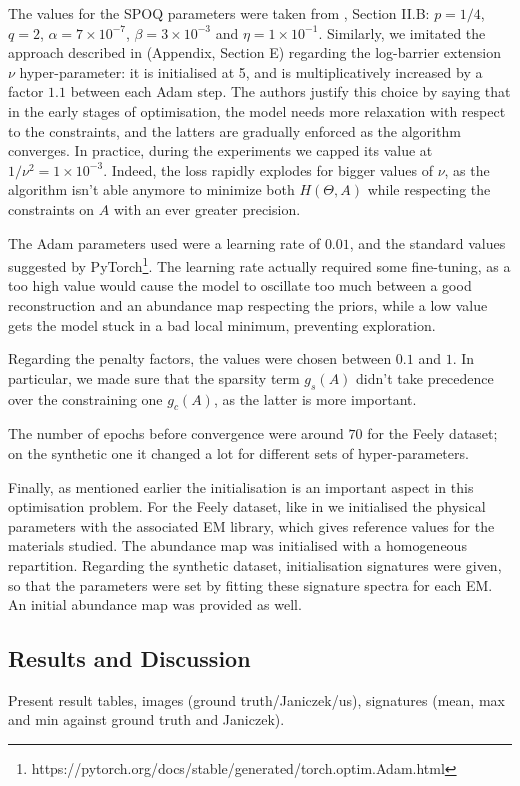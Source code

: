 \documentclass{article}
\begin{document}
The values for the SPOQ parameters were taken from \citet{cherni_spoq_2020}, Section II.B: $p=1/4$, $q=2$, $\alpha=7 \times 10^{-7}$, $\beta = 3 \times 10^{-3}$ and $\eta= 1 \times 10^{-1}$. Similarly, we imitated the approach described in \citet{kervadec_constrained_2020} (Appendix, Section E) regarding the log-barrier extension $\nu$ hyper-parameter: it is initialised at 5, and is multiplicatively increased by a factor $1.1$ between each Adam step. The authors justify this choice by saying that in the early stages of optimisation, the model needs more relaxation with respect to the constraints, and the latters are gradually enforced as the algorithm converges. In practice, during the experiments we capped its value at $1/\nu^2 = 1 \times 10^{-3}$. Indeed, the loss rapidly explodes for bigger values of $\nu$, as the algorithm isn't able anymore to minimize both $H(\Theta, A)$ while respecting the constraints on $A$ with an ever greater precision.

The Adam parameters used were a learning rate of $0.01$, and the standard values suggested by \textsf{PyTorch}\footnote{https://pytorch.org/docs/stable/generated/torch.optim.Adam.html}. The learning rate actually required some fine-tuning, as a too high value would cause the model to oscillate too much between a good reconstruction and an abundance map respecting the priors, while a low value gets the model stuck in a bad local minimum, preventing exploration.

Regarding the penalty factors, the values were chosen between $0.1$ and $1$. In particular, we made sure that the sparsity term $g_s(A)$ didn't take precedence over the constraining one $g_c(A)$, as the latter is more important.

The number of epochs before convergence were around $70$ for the Feely dataset; on the synthetic one it changed a lot for different sets of hyper-parameters.

Finally, as mentioned earlier the initialisation is an important aspect in this optimisation problem. For the Feely dataset, like in \citet{janiczek_differentiable_2020} we initialised the physical parameters with the associated EM library, which gives reference values for the materials studied. The abundance map was initialised with a homogeneous repartition. Regarding the synthetic dataset, initialisation signatures were given, so that the parameters were set by fitting these signature spectra for each EM. An initial abundance map was provided as well.

\subsection{Results and Discussion}
Present result tables, images (ground truth/Janiczek/us), signatures (mean, max and min against ground truth and Janiczek).
\end{document}
